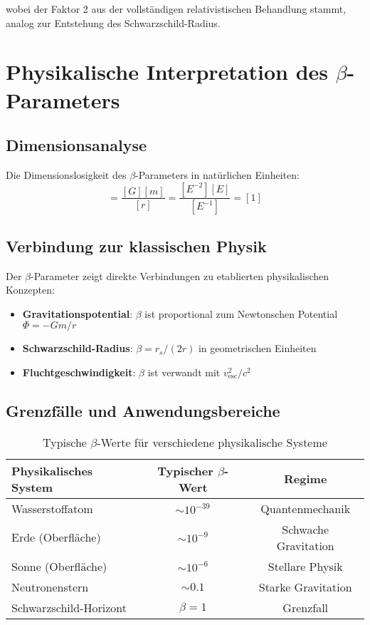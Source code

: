 \documentclass[12pt,a4paper]{article}
\begin{document}
	wobei der Faktor 2 aus der vollständigen relativistischen Behandlung stammt, analog zur Entstehung des Schwarzschild-Radius.
	
	\section{Physikalische Interpretation des $\beta$-Parameters}
	\label{sec:physical_interpretation}
	
	\subsection{Dimensionsanalyse}
	\label{subsec:dimensional_analysis}
	
	Die Dimensionslosigkeit des $\beta$-Parameters in natürlichen Einheiten:
	\begin{equation}
		[\beta] = \frac{[G][m]}{[r]} = \frac{[E^{-2}][E]}{[E^{-1}]} = [1]
	\end{equation}
	
	\subsection{Verbindung zur klassischen Physik}
	\label{subsec:classical_connection}
	
	Der $\beta$-Parameter zeigt direkte Verbindungen zu etablierten physikalischen Konzepten:
	
	\begin{itemize}
		\item \textbf{Gravitationspotential}: $\beta$ ist proportional zum Newtonschen Potential $\Phi = -Gm/r$
		\item \textbf{Schwarzschild-Radius}: $\beta = r_s/(2r)$ in geometrischen Einheiten
		\item \textbf{Fluchtgeschwindigkeit}: $\beta$ ist verwandt mit $v_{\text{esc}}^2/c^2$
	\end{itemize}
	
	\subsection{Grenzfälle und Anwendungsbereiche}
	\label{subsec:limiting_cases}
	
	\begin{table}[htbp]
		\centering
		\begin{tabular}{lcc}
			\toprule
			\textbf{Physikalisches System} & \textbf{Typischer $\beta$-Wert} & \textbf{Regime} \\
			\midrule
			Wasserstoffatom & $\sim 10^{-39}$ & Quantenmechanik \\
			Erde (Oberfläche) & $\sim 10^{-9}$ & Schwache Gravitation \\
			Sonne (Oberfläche) & $\sim 10^{-6}$ & Stellare Physik \\
			Neutronenstern & $\sim 0.1$ & Starke Gravitation \\
			Schwarzschild-Horizont & $\beta = 1$ & Grenzfall \\
			\bottomrule
		\end{tabular}
		\caption{Typische $\beta$-Werte für verschiedene physikalische Systeme}
		\label{tab:beta_values}
	\end{table}
	
\end{document}
